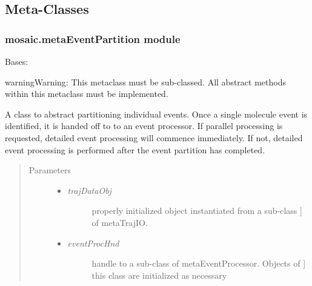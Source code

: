 \documentclass[letterpaper,10pt,english]{sphinxmanual}
\begin{document}
\subsection{Meta-Classes}
\label{api-doc/mosaic.meta:api-metaclass-page}\label{api-doc/mosaic.meta:meta-classes}\label{api-doc/mosaic.meta::doc}

\subsubsection{mosaic.metaEventPartition module}
\label{api-doc/mosaic.meta:mosaic-metaeventpartition-module}

\begin{fulllineitems}
\label{api-doc/mosaic.meta:mosaic.metaEventPartition.metaEventPartition}
Bases: \href{http://docs.python.org/library/functions.html\#object}{}

\begin{notice}{warning}{Warning:}
This metaclass must be sub-classed. All abstract methods within this metaclass must be implemented.
\end{notice}

A class to abstract partitioning individual events. Once a single 
molecule event is identified, it is handed off to to an event processor.
If parallel processing is requested, detailed event processing will commence
immediately. If not, detailed event processing is performed after the event 
partition has completed.
\begin{quote}\begin{description}
\item[{Parameters}] \leavevmode\begin{itemize}
\item {} \begin{description}
\item[{\emph{trajDataObj}}] \leavevmode{[}properly initialized object instantiated from a sub-class {]}
of metaTrajIO.

\end{description}

\item {} \begin{description}
\item[{\emph{eventProcHnd}}] \leavevmode{[}handle to a sub-class of metaEventProcessor. Objects of {]}
this class are initialized as necessary


\end{description}
\end{itemize}
\end{description}
\end{quote}
\end{fulllineitems}
\end{document}
